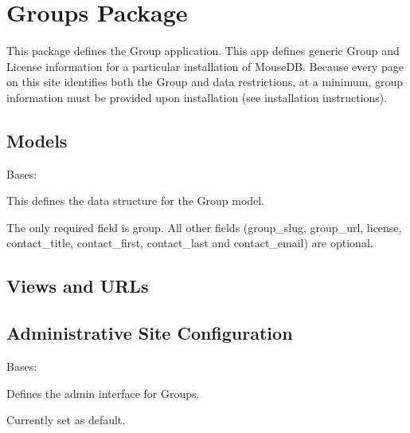 \documentclass[letterpaper,10pt,english]{sphinxmanual}
\begin{document}
\section{Groups Package}
\label{api:module-groups}\label{api:groups-package}
This package defines the Group application.
This app defines generic Group and License information for a particular installation of MouseDB.  
Because every page on this site identifies both the Group and data restrictions, at a minimum, group information must be provided upon installation (see installation instructions).


\subsection{Models}
\label{api:id11}\label{api:module-groups.models}

\begin{fulllineitems}
\label{api:groups.models.Group}
Bases: 

This defines the data structure for the Group model.

The only required field is group.
All other fields (group\_slug, group\_url, license, contact\_title, contact\_first, contact\_last and contact\_email) are optional.

\end{fulllineitems}



\subsection{Views and URLs}
\label{api:id12}\label{api:module-groups.views}

\subsection{Administrative Site Configuration}
\label{api:id13}\label{api:module-groups.admin}

\begin{fulllineitems}
\label{api:groups.admin.GroupAdmin}
Bases: 

Defines the admin interface for Groups.

Currently set as default.

\begin{fulllineitems}
\label{api:groups.admin.GroupAdmin.media}
\end{fulllineitems}


\end{fulllineitems}
\end{document}
